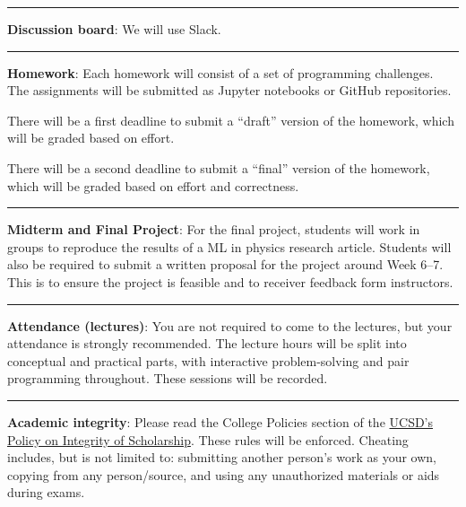 \documentclass[12pt]{article}
\begin{document}
\begin{center}
	\rule{\textwidth}{0.5pt}
\end{center}

\noindent\textbf{Discussion board}: We will use Slack.

\begin{center}
	\rule{\textwidth}{0.5pt}
\end{center}

\noindent\textbf{Homework}: Each homework will consist of a set of programming challenges.
The assignments will be submitted as Jupyter notebooks or GitHub repositories.

There will be a first deadline to submit a ``draft'' version of the homework, which will be graded based on effort.

There will be a second deadline to submit a ``final'' version of the homework, which will be graded based on effort and correctness.

\begin{center}
	\rule{\textwidth}{0.5pt}
\end{center}

\noindent\textbf{Midterm and Final Project}:
For the final project, students will work in groups to reproduce the results of a ML in physics research article.
Students will also be required to submit a written proposal for the project around Week 6--7.
This is to ensure the project is feasible and to receiver feedback form instructors.

\begin{center}
	\rule{\textwidth}{0.5pt}
\end{center}

\noindent\textbf{Attendance (lectures)}: You are not required to come to the lectures, but your attendance is strongly recommended.
The lecture hours will be split into conceptual and practical parts, with interactive problem-solving and pair programming throughout.
These sessions will be recorded.

\begin{center}
	\rule{\textwidth}{0.5pt}
\end{center}

\noindent\textbf{Academic integrity}: Please read the College Policies section of the \href{http://senate.ucsd.edu/Operating-Procedures/Senate-Manual/Appendices/2}{UCSD’s Policy on Integrity of Scholarship}.
These rules will be enforced.
Cheating includes, but is not limited to: submitting another person's work as your own, copying from any person/source, and using any unauthorized materials or aids during exams.
\end{document}
